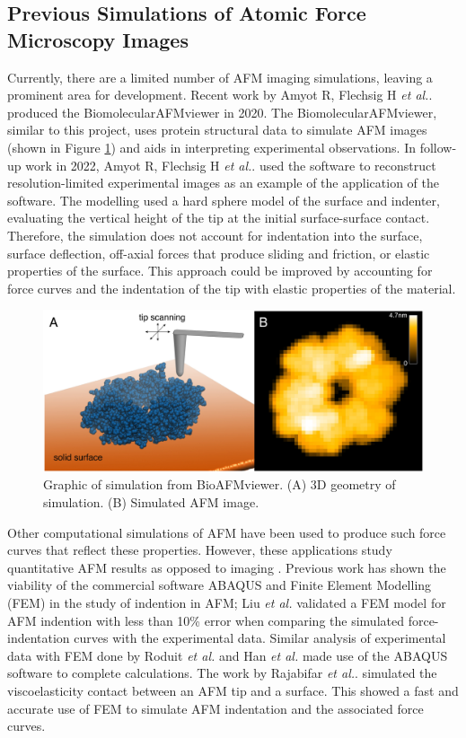 \subsection{Previous Simulations of Atomic Force Microscopy Images}

Currently, there are a limited number of AFM imaging simulations, leaving a prominent area for development. Recent work by Amyot R, Flechsig H  \textit{et al.}. \cite{amyot2020bioafmviewer} produced the BiomolecularAFMviewer in 2020. The BiomolecularAFMviewer, similar to this project, uses protein structural data to simulate AFM images (shown in Figure \ref{fig: BioAFMviewer}) and aids in interpreting experimental observations. In follow-up work in 2022, Amyot R, Flechsig H  \textit{et al.}.\cite{amyot2022simulation} used the software to reconstruct resolution-limited experimental images as an example of the application of the software. The modelling used a hard sphere model of the surface and indenter, evaluating the vertical height of the tip at the initial surface-surface contact. Therefore, the simulation does not account for indentation into the surface, surface deflection, off-axial forces that produce sliding and friction, or elastic properties of the surface. This approach could be improved by accounting for force curves and the indentation of the tip with elastic properties of the material. 

\begin{figure}[H]
    \centering
    \includegraphics[width=0.8\linewidth]{Figures/BioAFMviewer.png}
    \caption{Graphic of simulation from BioAFMviewer\cite{amyot2020bioafmviewer}. (A) 3D geometry of simulation. (B) Simulated AFM image.}
    \label{fig: BioAFMviewer}
\end{figure}

Other computational simulations of AFM have been used to produce such force curves that reflect these properties. However, these applications study quantitative AFM results as opposed to imaging \cite{liu2019finite,han2021modified,kontomaris2020hertz,senda2016computational}. Previous work has shown the viability of the commercial software ABAQUS and Finite Element Modelling (FEM) in the study of indention in AFM; Liu \textit{et al.}\cite{liu2019finite} validated a FEM model for AFM indention with less than 10\% error when comparing the simulated force-indentation curves with the experimental data. Similar analysis of experimental data with FEM done by Roduit \textit{et al.}\cite{roduit2009stiffness} and Han \textit{et al.}\cite{han2021modified} made use of the ABAQUS software to complete calculations. The work by Rajabifar \textit{et al.}.\cite{rajabifar2021fast} simulated the viscoelasticity contact between an AFM tip and a surface. This showed a fast and accurate use of FEM to simulate AFM indentation and the associated force curves. 